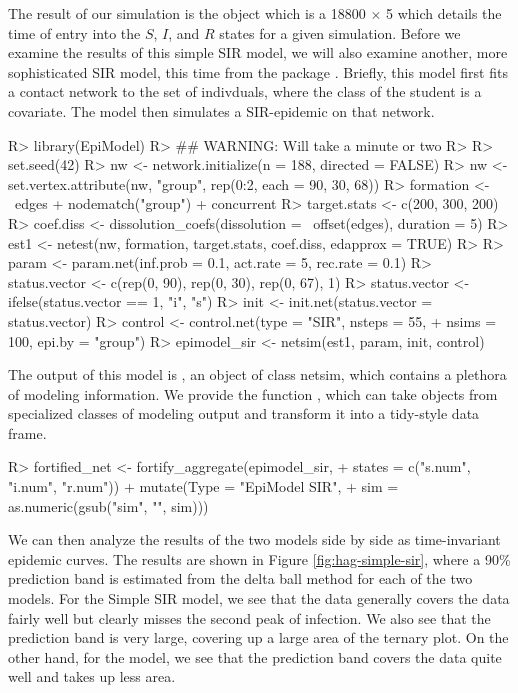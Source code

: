 \documentclass[
  shortnames]{jss}
\begin{document}
The result of our simulation is the object  which is a
18800 \(\times\) 5 which details the time of entry into the \(S\),
\(I\), and \(R\) states for a given simulation. Before we examine the
results of this simple SIR model, we will also examine another, more
sophisticated SIR model, this time from the package .
Briefly, this model first fits a contact network to the set of
indivduals, where the class of the student is a covariate. The model
then simulates a SIR-epidemic on that network.

\begin{CodeChunk}
\begin{CodeInput}
R> library(EpiModel)
R> ## WARNING:  Will take a minute or two
R> 
R> set.seed(42)
R> nw <- network.initialize(n = 188, directed = FALSE)
R> nw <- set.vertex.attribute(nw, "group", rep(0:2, each = 90, 30, 68))
R> formation <- ~edges + nodematch("group") + concurrent
R> target.stats <- c(200, 300, 200)
R> coef.diss <- dissolution_coefs(dissolution = ~offset(edges),  duration = 5)
R> est1 <- netest(nw, formation, target.stats, coef.diss, edapprox = TRUE)
R> 
R> param <- param.net(inf.prob = 0.1, act.rate = 5, rec.rate = 0.1)
R> status.vector <- c(rep(0, 90), rep(0, 30), rep(0, 67), 1)
R> status.vector <- ifelse(status.vector == 1, "i", "s")
R> init <- init.net(status.vector = status.vector)
R> control <- control.net(type = "SIR", nsteps = 55,
+                        nsims = 100, epi.by = "group")
R> epimodel_sir <- netsim(est1, param, init, control)
\end{CodeInput}
\end{CodeChunk}

The output of this model is , an object of class
netsim, which contains a plethora of modeling information. We provide
the function , which can take objects from
specialized classes of modeling output and transform it into a
tidy-style data frame.

\begin{CodeChunk}
\begin{CodeInput}
R> fortified_net <- fortify_aggregate(epimodel_sir, 
+                                    states = c("s.num", "i.num", "r.num")) %
+   mutate(Type = "EpiModel SIR",
+          sim = as.numeric(gsub("sim", "", sim)))
\end{CodeInput}
\end{CodeChunk}

We can then analyze the results of the two models side by side as
time-invariant epidemic curves. The results are shown in Figure
\ref{fig:hag-simple-sir}, where a 90\% prediction band is estimated from
the delta ball method for each of the two models. For the Simple SIR
model, we see that the data generally covers the data fairly well but
clearly misses the second peak of infection. We also see that the
prediction band is very large, covering up a large area of the ternary
plot. On the other hand, for the  model, we see that the
prediction band covers the data quite well and takes up less area.
\end{document}
